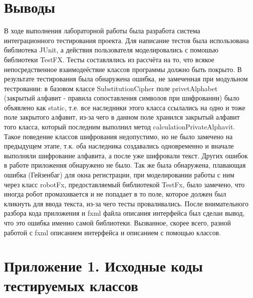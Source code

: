 \documentclass[a4paper,12pt]{article}
\begin{document}
\newpage\section{Выводы}
В ходе выполнения лабораторной работы была разработа система интеграционного тестирования проекта. Для написание тестов была использована библиотека JUnit, а действия пользователя моделировались с помошью библиотеки TestFX. Тесты составлялись из рассчёта на то, что всякое непосредственное взаимодеёствие классов программы должно быть покрыто. В результате тестирования была обнаружена ошибка, не замеченная при модульном тестровании: в базовом классе SubstitutionCipher поле privetAlphabet (закрытый алфавит - правила сопоставления символов при шифровании) было объявлено как static, т.е. все наследники этого класса ссылались на одно и тоже поле закрытого алфавит, из-за чего в данном поле хранился закрытый алфавит того класса, который последним выполнил метод calculationPrivateAlphavit. Такое поведение классов шифрования недопустимо, но не было замечено на предыдущем этапе, т.к. оба наследника создавались одновременно и вначале выполняли шифрование алфавита, а после уже шифровали текст. Других ошибок в работе приложения обнаружено не было.
Так же была обнаружена, плавающая ошибка (Гейзенбаг) для окна регистрации, при моделировании работы с ним через класс robotFx, предоставляемый библиотекой TestFx, было замечено, что иногда робот промахивается и не попадает в то поле, которое должен был кликнуть для ввода текста, из-за чего тесты проваливались. После внимательного разбора кода приложения и fxml файла описания интерфейса был сделан вывод, что это ошибка именно самой библиотеки. Вызванное, скорее всего, разной работой с fxml описанием интерфейса и описанием с помощью классов. 
\newpage\section*{Приложение 1. Исходные коды тестируемых классов}
\end{document}
